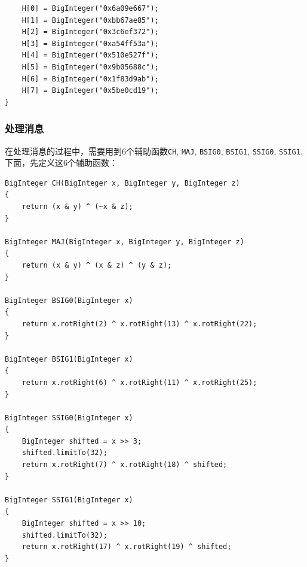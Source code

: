 \begin{prove}
\begin{verbatim}
    H[0] = BigInteger("0x6a09e667");
    H[1] = BigInteger("0xbb67ae85");
    H[2] = BigInteger("0x3c6ef372");
    H[3] = BigInteger("0xa54ff53a");
    H[4] = BigInteger("0x510e527f");
    H[5] = BigInteger("0x9b05688c");
    H[6] = BigInteger("0x1f83d9ab");
    H[7] = BigInteger("0x5be0cd19");
}
\end{verbatim}
\end{prove}
\subsubsection{处理消息}
在处理消息的过程中，需要用到6个辅助函数\verb`CH`, \verb`MAJ`, \verb`BSIG0`, \verb`BSIG1`, \verb`SSIG0`, \verb`SSIG1`. 下面，先定义这6个辅助函数：
\begin{prove}
\begin{verbatim}
BigInteger CH(BigInteger x, BigInteger y, BigInteger z)
{
    return (x & y) ^ (~x & z);
}

BigInteger MAJ(BigInteger x, BigInteger y, BigInteger z)
{
    return (x & y) ^ (x & z) ^ (y & z);
}

BigInteger BSIG0(BigInteger x)
{
    return x.rotRight(2) ^ x.rotRight(13) ^ x.rotRight(22);
}

BigInteger BSIG1(BigInteger x)
{
    return x.rotRight(6) ^ x.rotRight(11) ^ x.rotRight(25);
}

BigInteger SSIG0(BigInteger x)
{
    BigInteger shifted = x >> 3;
    shifted.limitTo(32);
    return x.rotRight(7) ^ x.rotRight(18) ^ shifted;
}

BigInteger SSIG1(BigInteger x)
{
    BigInteger shifted = x >> 10;
    shifted.limitTo(32);
    return x.rotRight(17) ^ x.rotRight(19) ^ shifted;
}
\end{verbatim}
\end{prove}

